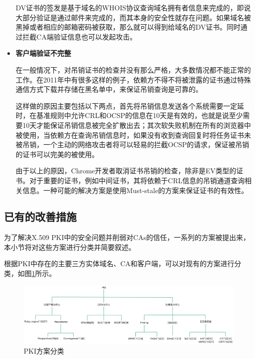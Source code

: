 \begin{itemize}
	DV证书的签发是基于域名的WHOIS协议查询域名拥有者信息来完成的，即说大部分验证是通过邮件来完成的，而其本身的安全性就存在问题。如果域名被黑掉或者相应的邮箱密码被获取，那么就可以得到给域名的DV证书。同时通过拦截CA端验证信息也可以发起攻击。



	\item 

	\noindent\textbf{客户端验证不完整}

	在一般情况下，对吊销证书的检查并没有那么严格，大多数情况都不能正常的工作。在2011年中有很多这样的例子，依赖方不得不将被泄露的证书通过特殊通信方式下载并存储在黑名单中，来保证吊销查询是可靠的。

	这样做的原因主要包括以下两点，首先将吊销信息发送各个系统需要一定延时，在基准规则中允许CRL和OCSP的信息在10天是有效的，也就是说至少需要10天才能保证吊销信息被完全扩散出去；其次软失败机制在所有的浏览器中被使用，当依赖方在查询吊销信息时，如果没有收到查询回复时将任务证书未被吊销，一个主动的网络攻击者将可以轻易的拦截OCSP的请求，保证被吊销的证书可以完美的被使用。

	由于以上的原因，Chrome开发者取消证书吊销的检查，除非是EV类型的证书。对于重要的证书，例如中间证书，其将依赖于CRL信息的吊销通道查询相关信息。一种可能的解决方案是使用Must-stale的方案来保证证书的有效性。

\end{itemize}


\subsection{已有的改善措施}

为了解决X.509 PKI中的安全问题并削弱对CAs的信任，一系列的方案被提出来，本小节将对这些方案进行分类并简要叙述。



根据PKI中存在的主要三方实体域名、CA和客户端，可以对现有的方案进行分类，如图\ref{fig:Classification_of_PKI_proposals}所示。

\begin{figure}[htbp]
 	\centering
 	\includegraphics[width = 1.0\textwidth]{img/Classification_of_PKI_proposals}
 	\caption{PKI方案分类}\label{fig:Classification_of_PKI_proposals}
\end{figure}



